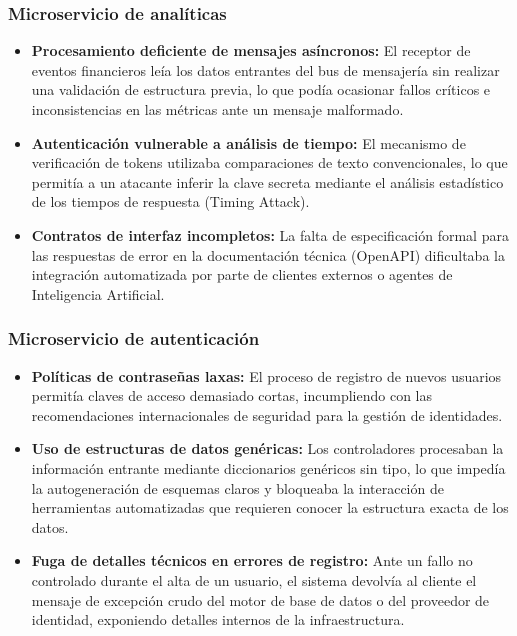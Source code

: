 \subsubsection{Microservicio de analíticas}

\begin{itemize}
    \item \textbf{Procesamiento deficiente de mensajes asíncronos:} El receptor de eventos financieros leía los datos entrantes del bus de mensajería sin realizar una validación de estructura previa, lo que podía ocasionar fallos críticos e inconsistencias en las métricas ante un mensaje malformado.
    \item \textbf{Autenticación vulnerable a análisis de tiempo:} El mecanismo de verificación de tokens utilizaba comparaciones de texto convencionales, lo que permitía a un atacante inferir la clave secreta mediante el análisis estadístico de los tiempos de respuesta (Timing Attack).
    \item \textbf{Contratos de interfaz incompletos:} La falta de especificación formal para las respuestas de error en la documentación técnica (OpenAPI) dificultaba la integración automatizada por parte de clientes externos o agentes de Inteligencia Artificial.
\end{itemize}

\newpage

\subsubsection{Microservicio de autenticación}

\begin{itemize}
    \item \textbf{Políticas de contraseñas laxas:} El proceso de registro de nuevos usuarios permitía claves de acceso demasiado cortas, incumpliendo con las recomendaciones internacionales de seguridad para la gestión de identidades.
    \item \textbf{Uso de estructuras de datos genéricas:} Los controladores procesaban la información entrante mediante diccionarios genéricos sin tipo, lo que impedía la autogeneración de esquemas claros y bloqueaba la interacción de herramientas automatizadas que requieren conocer la estructura exacta de los datos.
    \item \textbf{Fuga de detalles técnicos en errores de registro:} Ante un fallo no controlado durante el alta de un usuario, el sistema devolvía al cliente el mensaje de excepción crudo del motor de base de datos o del proveedor de identidad, exponiendo detalles internos de la infraestructura.
\end{itemize}

